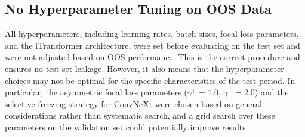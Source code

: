 \subsection{No Hyperparameter Tuning on OOS Data}

All hyperparameters, including learning rates, batch sizes, focal loss parameters, and the iTransformer architecture, were set before evaluating on the test set and were not adjusted based on OOS performance. This is the correct procedure and ensures no test-set leakage. However, it also means that the hyperparameter choices may not be optimal for the specific characteristics of the test period. In particular, the asymmetric focal loss parameters ($\gamma^+ = 1.0$, $\gamma^- = 2.0$) and the selective freezing strategy for ConvNeXt were chosen based on general considerations rather than systematic search, and a grid search over these parameters on the validation set could potentially improve results.
